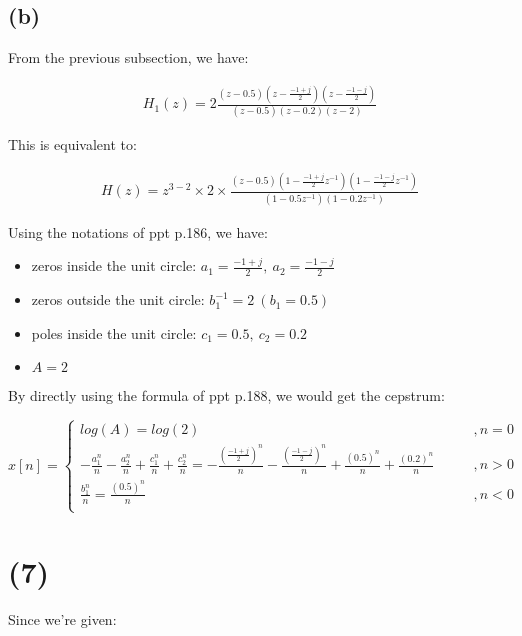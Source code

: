 \documentclass{article}
\begin{document}
\subsection*{(b)}

From the previous subsection, we have:

\begin{align*}
    H_1(z) = 2 \frac{(z - 0.5)(z - \frac{-1 + j}{2})(z - \frac{-1 - j}{2})}{(z - 0.5)(z - 0.2)(z - 2)}
\end{align*}

This is equivalent to:

\begin{align*}
    H(z) = z^{3 - 2} \times 2 \times \frac{(z - 0.5)(1 - \frac{-1 + j}{2}z^{-1})(1 - \frac{-1 - j}{2}z^{-1})}{(1 - 0.5z^{-1})(1 - 0.2z^{-1})} 
\end{align*}

Using the notations of ppt p.186, we have:

\begin{itemize}
    \item zeros inside the unit circle: $a_1 = \frac{-1 + j}{2}, \ a_2 = \frac{-1 - j}{2}$
    \item zeros outside the unit circle: $b_1^{-1} = 2 \ (b_1 = 0.5)$
    \item poles inside the unit circle: $c_1 = 0.5, \ c_2 = 0.2$
    \item $A = 2$
\end{itemize}

By directly using the formula of ppt p.188, we would get the cepstrum:

\begin{equation*}
\hat{x}[n] = 
    \begin{cases}
    log(A) = log(2) \qquad &,n = 0\\
    - \frac{a_1^n}{n} - \frac{a_2^n}{n} + \frac{c_1^n}{n} + \frac{c_2^n}{n} = - \frac{(\frac{-1 + j}{2})^n}{n} - \frac{(\frac{-1 - j}{2})^n}{n} + \frac{(0.5)^n}{n} + \frac{(0.2)^n}{n} \qquad &,n > 0\\
    \frac{b_1^n}{n} =  \frac{(0.5)^n}{n} \qquad &,n < 0\\
    \end{cases}
\end{equation*}

\section*{(7)}

Since we're given:
\end{document}
